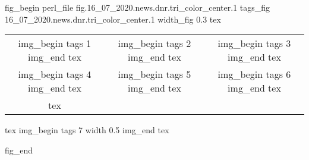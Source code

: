  
 
 
\ifcmt
fig_begin
	perl_file fig.16_07_2020.news.dnr.tri_color_center.1
	tags_fig 16_07_2020.news.dnr.tri_color_center.1
	width_fig 0.3
	tex \begin{tabular}{ccc}
	img_begin 
		tags 1
	img_end
	tex &
	img_begin 
		tags 2
	img_end
	tex &
	img_begin 
		tags 3
	img_end
	tex \\
	img_begin 
		tags 4
	img_end
	tex &
	img_begin 
		tags 5
	img_end
	tex &
	img_begin 
		tags 6
	img_end
	tex \\
	tex \end{tabular}
	tex \centering
	img_begin 
		tags 7
		width 0.5
	img_end
	tex \caption{\sectitle}
fig_end
\fi

